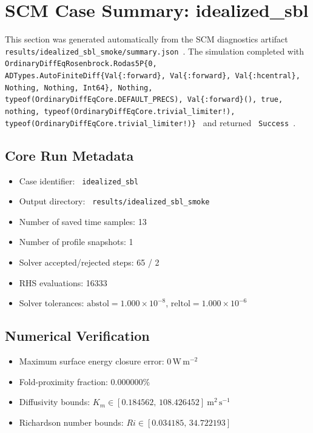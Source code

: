 \section{SCM Case Summary: idealized\_sbl}
\label{sec:scm_case_idealized_sbl_smoke_idealized_sbl_80x2m_0h_report}

This section was generated automatically from the SCM diagnostics artifact
\texttt{ results/idealized\_sbl\_smoke/summary.json }. The simulation completed with \texttt{ OrdinaryDiffEqRosenbrock.Rodas5P\{0, ADTypes.AutoFiniteDiff\{Val\{:forward\}, Val\{:forward\}, Val\{:hcentral\}, Nothing, Nothing, Int64\}, Nothing, typeof(OrdinaryDiffEqCore.DEFAULT\_PRECS), Val\{:forward\}(), true, nothing, typeof(OrdinaryDiffEqCore.trivial\_limiter!), typeof(OrdinaryDiffEqCore.trivial\_limiter!)\} }
and returned \texttt{ Success }.

\subsection{Core Run Metadata}
\begin{itemize}
  \item Case identifier: \texttt{ idealized\_sbl }
  \item Output directory: \texttt{ results/idealized\_sbl\_smoke }
  \item Number of saved time samples: 13
  \item Number of profile snapshots: 1
  \item Solver accepted/rejected steps: 65 / 2
  \item RHS evaluations: 16333
  \item Solver tolerances: $\mathrm{abstol}=1.000 \times 10^{-8}$, $\mathrm{reltol}=1.000 \times 10^{-6}$
\end{itemize}

\subsection{Numerical Verification}
\begin{itemize}
  \item Maximum surface energy closure error:
  $0\,\mathrm{W\,m^{-2}}$
  \item Fold-proximity fraction:
  $0.000000\%$
  \item Diffusivity bounds:
  $K_m \in [0.184562,\,108.426452]~\mathrm{m^2\,s^{-1}}$
  \item Richardson number bounds:
  $Ri \in [0.034185,\,34.722193]$
\end{itemize}

